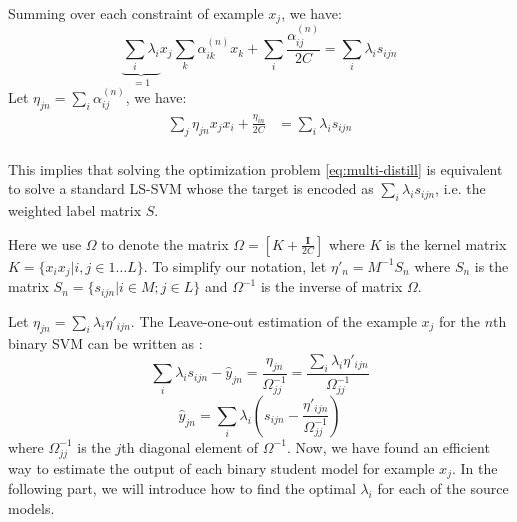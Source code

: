 Summing over each constraint of example $x_j$, we have:
\begin{equation}
\underbrace{\sum_i\lambda_i}_{=1} x_j\sum_{k}\alpha^{(n)}_{ik}x_k+\sum_i\frac{\alpha^{(n)}_{ij}}{2C}=\sum_i\lambda_is_{ijn}
\end{equation}
Let %
$\eta_{jn}=\sum_i\alpha^{(n)}_{ij}$, we have:
\begin{equation}
\begin{aligned}
\sum_j\eta_{jn}x_jx_i+\frac{\eta_{in}}{2C}&=\sum_i\lambda_is_{ijn}\\
\end{aligned}
\end{equation}

This implies that solving the optimization problem \eqref{eq:multi-distill} is equivalent to solve a standard LS-SVM whose the target is encoded as $\sum_i\lambda_is_{ijn}$, i.e. the weighted label matrix $S$.

Here we use $\Omega$ to denote the matrix $\Omega=[K+\frac{\mathbf{I}}{2C}]$ where $K$ is the kernel matrix $K=\{x_ix_j|i,j\in 1\dots L\}$. To simplify our notation, let ${\eta}'_{n}=M^{-1}S_n$ where $S_n$ is the matrix $S_n=\{s_{ijn}|i\in M;j\in L\}$ and $\Omega^{-1}$ is the inverse of matrix $\Omega$. 

Let $\eta_{jn}=\sum_i\lambda_i{\eta}'_{ijn}$.
The Leave-one-out estimation of the example $x_j$ for the $n$th binary SVM can be written as \cite{cawley2006leave}:
\[\sum_i\lambda_is_{ijn}-\hat{y}_{jn} =\frac{{\eta}_{jn}}{\Omega_{jj}^{-1}} =\frac{\sum_i\lambda_i{\eta}'_{ijn}}{\Omega_{jj}^{-1}}\]
\begin{equation}\label{eq:yhat}
\hat{y}_{jn} = \sum_i\lambda_i\left(s_{ijn}-\frac{{\eta}'_{ijn}}{\Omega_{jj}^{-1}}\right)
\end{equation}
where $\Omega^{-1}_{jj}$ is the $j$th diagonal element of $\Omega^{-1}$. Now, we have found an efficient way to estimate the output of each binary student model for example $x_j$. In the following part, we will introduce how to find the optimal $\lambda_i$ for each of the source models. 
